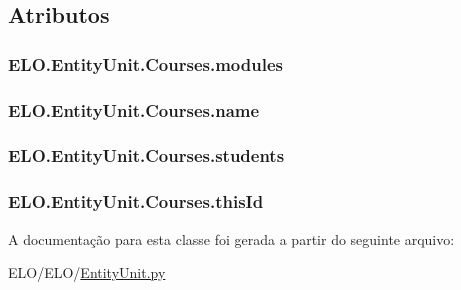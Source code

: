 \subsection{Atributos}
\hypertarget{classELO_1_1EntityUnit_1_1Courses_a14bdc53eeb2a7fde8e926cbab6e5206f}{
\subsubsection[{modules}]{\setlength{\rightskip}{0pt plus 5cm}E\-L\-O.\-Entity\-Unit.\-Courses.\-modules}}\label{classELO_1_1EntityUnit_1_1Courses_a14bdc53eeb2a7fde8e926cbab6e5206f}
\hypertarget{classELO_1_1EntityUnit_1_1Courses_aeb94f54ad74895834eb7627dd38e1c8e}{
\subsubsection[{name}]{\setlength{\rightskip}{0pt plus 5cm}E\-L\-O.\-Entity\-Unit.\-Courses.\-name}}\label{classELO_1_1EntityUnit_1_1Courses_aeb94f54ad74895834eb7627dd38e1c8e}
\hypertarget{classELO_1_1EntityUnit_1_1Courses_ac8e5e595ec895e03b088764d7506e735}{
\subsubsection[{students}]{\setlength{\rightskip}{0pt plus 5cm}E\-L\-O.\-Entity\-Unit.\-Courses.\-students}}\label{classELO_1_1EntityUnit_1_1Courses_ac8e5e595ec895e03b088764d7506e735}
\hypertarget{classELO_1_1EntityUnit_1_1Courses_a283b817d129a8d15e3bce56b368a169d}{
\subsubsection[{this\-Id}]{\setlength{\rightskip}{0pt plus 5cm}E\-L\-O.\-Entity\-Unit.\-Courses.\-this\-Id}}\label{classELO_1_1EntityUnit_1_1Courses_a283b817d129a8d15e3bce56b368a169d}


A documentação para esta classe foi gerada a partir do seguinte arquivo\-:\begin{DoxyCompactItemize}
\item 
E\-L\-O/\-E\-L\-O/\hyperlink{EntityUnit_8py}{Entity\-Unit.\-py}\end{DoxyCompactItemize}

